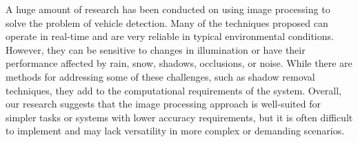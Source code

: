 A huge amount of research has been conducted on using image processing to solve
the problem of vehicle detection.\cite{ImageProcessingOverview} Many of the
techniques proposed can operate in real-time and are very reliable in typical
environmental conditions. However, they can be sensitive to changes in
illumination or have their performance affected by rain, snow, shadows,
occlusions, or noise. While there are methods for addressing some of these
challenges, such as shadow removal techniques\cite{ShadowRemoval}, they add to
the computational requirements of the system. Overall, our research suggests
that the image processing approach is well-suited for simpler tasks or systems
with lower accuracy requirements, but it is often difficult to implement and may
lack versatility in more complex or demanding scenarios.







